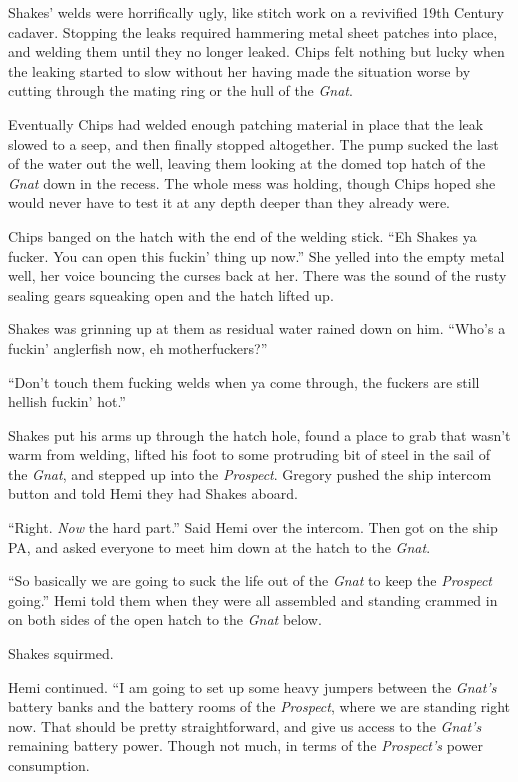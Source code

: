 \documentclass[
]{scrbook}
\begin{document}
Shakes' welds were horrifically ugly, like stitch work on a revivified
19th Century cadaver. Stopping the leaks required hammering metal sheet
patches into place, and welding them until they no longer leaked. Chips
felt nothing but lucky when the leaking started to slow without her
having made the situation worse by cutting through the mating ring or
the hull of the \emph{Gnat}.

Eventually Chips had welded enough patching material in place that the
leak slowed to a seep, and then finally stopped altogether. The pump
sucked the last of the water out the well, leaving them looking at the
domed top hatch of the \emph{Gnat} down in the recess. The whole mess
was holding, though Chips hoped she would never have to test it at any
depth deeper than they already were.

Chips banged on the hatch with the end of the welding stick. ``Eh Shakes
ya fucker. You can open this fuckin' thing up now.'' She yelled into the
empty metal well, her voice bouncing the curses back at her. There was
the sound of the rusty sealing gears squeaking open and the hatch lifted
up.

Shakes was grinning up at them as residual water rained down on him.
``Who's a fuckin' anglerfish now, eh motherfuckers?''

``Don't touch them fucking welds when ya come through, the fuckers are
still hellish fuckin' hot.''

Shakes put his arms up through the hatch hole, found a place to grab
that wasn't warm from welding, lifted his foot to some protruding bit of
steel in the sail of the \emph{Gnat}, and stepped up into the
\emph{Prospect}. Gregory pushed the ship intercom button and told Hemi
they had Shakes aboard.

``Right. \emph{Now} the hard part.'' Said Hemi over the intercom. Then
got on the ship PA, and asked everyone to meet him down at the hatch to
the \emph{Gnat}.

``So basically we are going to suck the life out of the \emph{Gnat} to
keep the \emph{Prospect} going.'' Hemi told them when they were all
assembled and standing crammed in on both sides of the open hatch to the
\emph{Gnat} below.

Shakes squirmed.

Hemi continued. ``I am going to set up some heavy jumpers between the
\emph{Gnat's} battery banks and the battery rooms of the
\emph{Prospect}, where we are standing right now. That should be pretty
straightforward, and give us access to the \emph{Gnat's} remaining
battery power. Though not much, in terms of the \emph{Prospect's} power
consumption.
\end{document}
